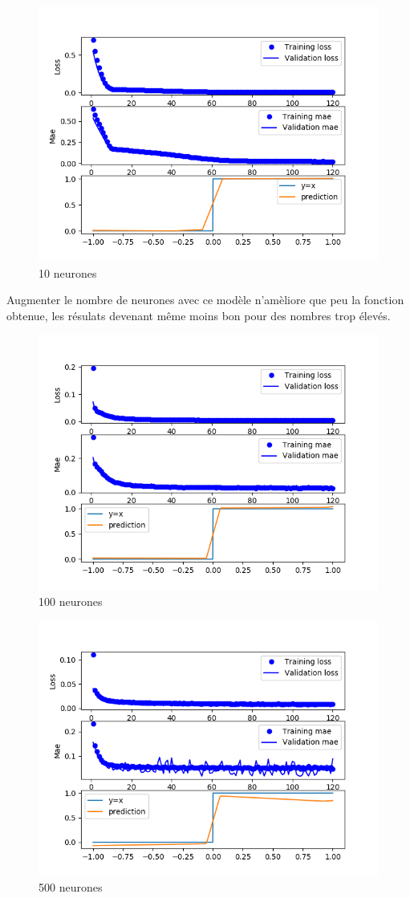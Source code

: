 \documentclass[a4paper,11pt,twoside]{report}
\begin{document}
	\begin{figure}[H]
		\begin{center}
			\includegraphics[width=0.7\linewidth]{8.png}
			\caption{10 neurones}
		\end{center}
	\end{figure}
	Augmenter le nombre de neurones avec ce modèle n'amèliore que peu la fonction obtenue, les résulats devenant même moins bon pour des nombres trop élevés.
	\begin{figure}[H]
		\begin{center}
			\includegraphics[width=0.7\linewidth]{100.png}
			\caption{100 neurones}
		\end{center}
	\end{figure}
		\begin{figure}[H]
		\begin{center}
			\includegraphics[width=0.7\linewidth]{500.png}
			\caption{500 neurones}
		\end{center}
	\end{figure}
\end{document}
